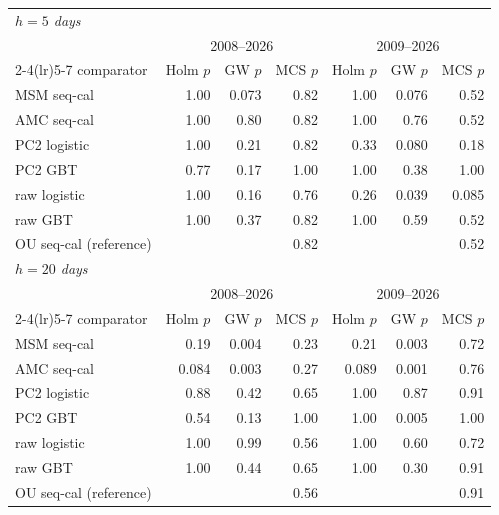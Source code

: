 \begin{tabular}{lrrrrrr}\toprule
\multicolumn{7}{l}{\emph{$h=5$ days}}\\
 & \multicolumn{3}{c}{2008--2026} & \multicolumn{3}{c}{2009--2026}\\\cmidrule(lr){2-4}\cmidrule(lr){5-7}
comparator & Holm $p$ & GW $p$ & MCS $p$ & Holm $p$ & GW $p$ & MCS $p$\\\midrule
MSM seq-cal & 1.00 & 0.073 & 0.82 & 1.00 & 0.076 & 0.52\\
AMC seq-cal & 1.00 & 0.80 & 0.82 & 1.00 & 0.76 & 0.52\\
PC2 logistic & 1.00 & 0.21 & 0.82 & 0.33 & 0.080 & 0.18\\
PC2 GBT & 0.77 & 0.17 & 1.00 & 1.00 & 0.38 & 1.00\\
raw logistic & 1.00 & 0.16 & 0.76 & 0.26 & 0.039 & 0.085\\
raw GBT & 1.00 & 0.37 & 0.82 & 1.00 & 0.59 & 0.52\\
OU seq-cal (reference) & & & 0.82 & & & 0.52\\\midrule
\multicolumn{7}{l}{\emph{$h=20$ days}}\\
 & \multicolumn{3}{c}{2008--2026} & \multicolumn{3}{c}{2009--2026}\\\cmidrule(lr){2-4}\cmidrule(lr){5-7}
comparator & Holm $p$ & GW $p$ & MCS $p$ & Holm $p$ & GW $p$ & MCS $p$\\\midrule
MSM seq-cal & 0.19 & 0.004 & 0.23 & 0.21 & 0.003 & 0.72\\
AMC seq-cal & 0.084 & 0.003 & 0.27 & 0.089 & 0.001 & 0.76\\
PC2 logistic & 0.88 & 0.42 & 0.65 & 1.00 & 0.87 & 0.91\\
PC2 GBT & 0.54 & 0.13 & 1.00 & 1.00 & 0.005 & 1.00\\
raw logistic & 1.00 & 0.99 & 0.56 & 1.00 & 0.60 & 0.72\\
raw GBT & 1.00 & 0.44 & 0.65 & 1.00 & 0.30 & 0.91\\
OU seq-cal (reference) & & & 0.56 & & & 0.91\\
\bottomrule\end{tabular}
